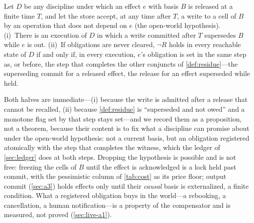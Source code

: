\begin{proposition}
\label{prop:owed}
Let $D$ be any discipline under which an effect $e$ with basis $B$ is
released at a finite time $T$, and let the store accept, at any time after
$T$, a write to a cell of $B$ by an operation that does not depend on $e$
(the open-world hypothesis). (i)~There is an execution of $D$ in which a
write committed after $T$ supersedes $B$ while $e$ is out. (ii)~If
obligations are never cleared, $\neg R$ holds in every reachable state of
$D$ if and only if, in every execution, $e$'s obligation is set in the same
step as, or before, the step that completes the other conjuncts of
\cref{def:residue}---the superseding commit for a released effect, the
release for an effect superseded while held.
\end{proposition}
Both halves are immediate---(i) because the write is admitted after a
release that cannot be recalled, (ii) because \cref{def:residue} is
``superseded and not owed'' and a monotone flag set by that step stays
set---and we record them as a proposition, not a theorem, because their
content is to fix what a discipline can promise about \Rp{} under the
open-world hypothesis: not a current basis, but an obligation registered
atomically with the step that completes the witness, which the ledger of
\cref{sec:ledger} does at both steps. Dropping the hypothesis is possible
and is not free: freezing the cells of $B$ until the effect is acknowledged
is a lock held past commit, with the pessimistic column of \cref{tab:cost}
as its price floor; output commit (\cref{sec:a3}) holds effects only until
their \emph{causal} basis is externalized, a finite condition. What a
registered obligation buys in the world---a rebooking, a cancellation, a
human notification---is a property of the compensator and is measured, not
proved (\cref{sec:live-a1}).
